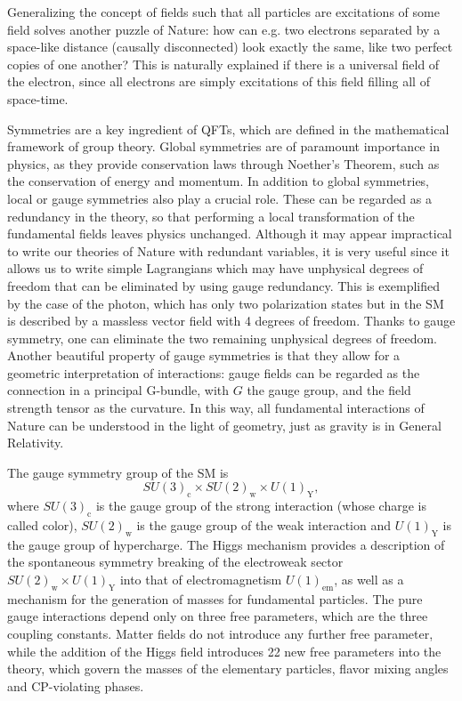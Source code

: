 Generalizing the concept of fields such that all particles are excitations of some field solves another puzzle of Nature: how can e.g. two electrons separated by a space-like distance (causally disconnected) look exactly the same, like two perfect copies of one another? This is naturally explained if there is a universal field of the electron, since all electrons are simply excitations of this field filling all of space-time. 

Symmetries are a key ingredient of QFTs, which are defined in the mathematical framework of group theory. Global symmetries are of paramount importance in physics, as they provide conservation laws through Noether's Theorem, such as the conservation of energy and momentum. In addition to global symmetries, local or gauge symmetries also play a crucial role. These can be regarded as a redundancy in the theory, so that performing a local transformation of the fundamental fields leaves physics unchanged. Although it may appear impractical to write our theories of Nature with redundant variables, it is very useful since it allows us to write simple Lagrangians which may have unphysical degrees of freedom that can be eliminated by using gauge redundancy. This is exemplified by the case of the photon, which has only two polarization states but in the SM is described by a massless vector field with 4 degrees of freedom. Thanks to gauge symmetry, one can eliminate the two remaining unphysical degrees of freedom. Another beautiful property of gauge symmetries is that they allow for a geometric interpretation of interactions: gauge fields can be regarded as the connection in a principal G-bundle, with $G$ the gauge group, and the field strength tensor as the curvature. In this way, all fundamental interactions of Nature can be understood in the light of geometry, just as gravity is in General Relativity.

The gauge symmetry group of the SM is
\begin{equation*}
SU(3)_{\textrm{c}}\times SU(2)_{\textrm{w}}\times U(1)_{\textrm{Y}},
\end{equation*}
where $SU(3)_{\textrm{c}}$ is the gauge group of the strong interaction (whose charge is called color), $SU(2)_{\textrm{w}}$ is the gauge group of the weak interaction and $U(1)_{\textrm{Y}}$ is the gauge group of hypercharge. The Higgs mechanism provides a description of the spontaneous symmetry breaking of the electroweak sector $SU(2)_{\textrm{w}}\times U(1)_{\textrm{Y}}$ into that of electromagnetism $U(1)_{\textrm{em}}$, as well as a mechanism for the generation of masses for fundamental particles. The pure gauge interactions depend only on three free parameters, which are the three coupling constants. Matter fields do not introduce any further free parameter, while the addition of the Higgs field introduces 22 new free parameters into the theory, which govern the masses of the elementary particles, flavor mixing angles and CP-violating phases.

